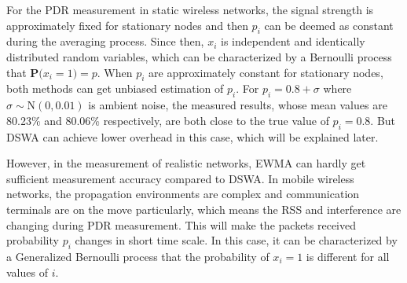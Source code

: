 \documentclass[journal,onecolumn,12pt]{IEEEtran}
\begin{document}
For the PDR measurement in static wireless networks, the signal strength is approximately fixed for stationary nodes \cite{reis2006model} and then $p_i$ can be deemed as constant during the averaging process. Since then, $x_i$ is independent and identically distributed random variables, which can be characterized by a Bernoulli process that $\textbf{P(}x_i=1\textbf{)}=p$. When $p_i$ are approximately constant for stationary nodes, both methods can get unbiased estimation of $p_i$. For $p_i=0.8+\sigma$ where $\sigma\sim \textrm{N}(0,0.01)$ is ambient noise, the measured results, whose mean values are 80.23\% and 80.06\% respectively, are both close to the true value of $p_i=0.8$. But DSWA can achieve lower overhead in this case, which will be explained later.

However, in the measurement of realistic networks, EWMA can hardly get sufficient measurement accuracy compared to DSWA. In mobile wireless networks, the propagation environments are complex and communication terminals are on the move particularly, which means the RSS and interference are changing during PDR measurement. This will make the packets received probability $p_i$ changes in short time scale. In this case, it can be characterized by a Generalized Bernoulli process that the probability of $x_i=1$ is different for all values of $i$.
\end{document}
